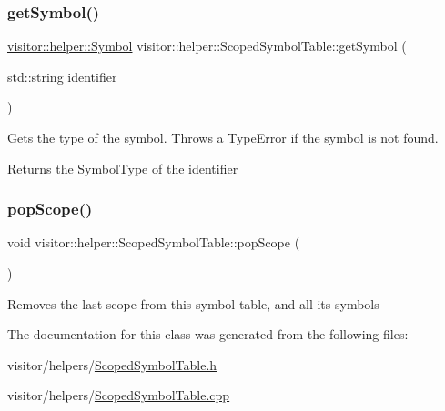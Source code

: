 \subsubsection{\texorpdfstring{get\+Symbol()}{getSymbol()}}
{\footnotesize\ttfamily \hyperlink{structvisitor_1_1helper_1_1Symbol}{visitor\+::helper\+::\+Symbol} visitor\+::helper\+::\+Scoped\+Symbol\+Table\+::get\+Symbol (\begin{DoxyParamCaption}\item[{std\+::string}]{identifier }\end{DoxyParamCaption})}

Gets the type of the symbol. Throws a Type\+Error if the symbol is not found. \begin{DoxyReturn}{Returns}
the Symbol\+Type of the identifier 
\end{DoxyReturn}
\mbox{\label{classvisitor_1_1helper_1_1ScopedSymbolTable_afbeb4833a967d03a31f00306b5c21eb1}} 
\subsubsection{\texorpdfstring{pop\+Scope()}{popScope()}}
{\footnotesize\ttfamily void visitor\+::helper\+::\+Scoped\+Symbol\+Table\+::pop\+Scope (\begin{DoxyParamCaption}{ }\end{DoxyParamCaption})}

Removes the last scope from this symbol table, and all it\textquotesingle{}s symbols 

The documentation for this class was generated from the following files\+:\begin{DoxyCompactItemize}
\item 
visitor/helpers/\hyperlink{ScopedSymbolTable_8h}{Scoped\+Symbol\+Table.\+h}\item 
visitor/helpers/\hyperlink{ScopedSymbolTable_8cpp}{Scoped\+Symbol\+Table.\+cpp}\end{DoxyCompactItemize}
